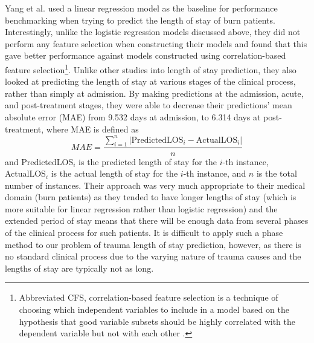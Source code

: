 Yang et al. \citep{Yang2010} used a linear regression model as the baseline for
performance benchmarking when trying to predict the length of stay of burn
patients. Interestingly, unlike the logistic regression models discussed above,
they did not perform any feature selection when constructing their models and
found that this gave better performance against models constructed using
correlation-based feature selection\footnote{Abbreviated CFS, correlation-based
feature selection is a technique of choosing which independent variables to
include in a model based on the hypothesis that good variable subsets should
be highly correlated with the dependent variable but not with each
other \citep{Hall2000}.}. Unlike other studies into length of stay prediction,
they also looked at predicting the length of stay at various stages of the
clinical process, rather than simply at admission. By making predictions
at the admission, acute, and post-treatment stages, they were able to decrease
their predictions' mean absolute error (MAE) from 9.532 days at admission, to
6.314 days at post-treatment, where MAE is defined as
\begin{equation}
MAE = \frac{\sum_{i=1}^n |\mathrm{PredictedLOS}_i-\mathrm{ActualLOS}_i|}{n}
\end{equation}
and PredictedLOS$_i$ is the predicted length of stay for the $i$-th instance,
ActualLOS$_i$ is the actual length of stay for the $i$-th instance, and $n$
is the total number of instances. Their approach was very much appropriate to
their medical domain (burn patients) as they tended to have longer lengths of
stay (which is more suitable for linear regression rather than logistic
regression) and the extended period of stay means that there will be enough
data from several phases of the clinical process for such patients. It is
difficult to apply such a phase method to our problem of trauma length of
stay prediction, however, as there is no standard clinical process due to
the varying nature of trauma causes and the lengths of stay are typically not
as long.


